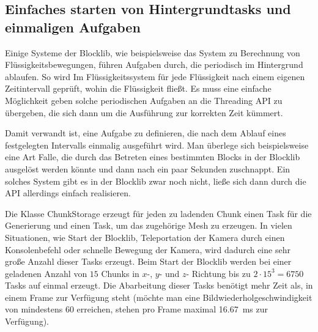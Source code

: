 \subsection{Einfaches starten von Hintergrundtasks und einmaligen Aufgaben}
Einige Systeme der Blocklib, wie beispielsweise das System zu Berechnung von Flüssigkeitsbewegungen, führen Aufgaben durch, die periodisch im Hintergrund ablaufen. So wird Im Flüssigkeitssystem für jede Flüssigkeit nach einem eigenen Zeitintervall geprüft, wohin die Flüssigkeit fließt. Es muss eine einfache Möglichkeit geben solche periodischen Aufgaben an die Threading API zu übergeben, die sich dann um die Ausführung zur korrekten Zeit kümmert.

Damit verwandt ist, eine Aufgabe zu definieren, die nach dem Ablauf eines festgelegten Intervalls einmalig ausgeführt wird. Man überlege sich beispielsweise eine Art Falle, die durch das Betreten eines bestimmten Blocks in der Blocklib ausgelöst werden könnte und dann nach ein paar Sekunden zuschnappt. Ein solches System gibt es in der Blocklib zwar noch nicht, ließe sich dann durch die API allerdings einfach realisieren.

Die Klasse ChunkStorage erzeugt für jeden zu ladenden Chunk einen Task für die Generierung und einen Task, um das zugehörige Mesh zu erzeugen. In vielen Situationen, wie  Start der Blocklib, Teleportation der Kamera durch einen Konsolenbefehl oder schnelle Bewegung der Kamera, wird dadurch eine sehr große Anzahl dieser Tasks erzeugt. Beim Start der Blocklib werden bei einer geladenen Anzahl von $15$ Chunks in  $x$-, $y$- und $z$- Richtung bis zu $2\cdot15^3=6750$  Tasks auf einmal erzeugt. Die Abarbeitung dieser Tasks benötigt mehr Zeit als, in einem Frame zur Verfügung steht (möchte man eine Bildwiederholgeschwindigkeit von mindestens \SI{60}{\fps} erreichen, stehen pro Frame maximal \SI{16,67}{\milli\second} zur Verfügung).